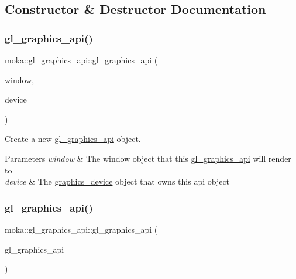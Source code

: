 \subsection{Constructor \& Destructor Documentation}
\mbox{\label{classmoka_1_1gl__graphics__api_a8e65801bf2edf0891bae8936f964ed0f}} 
\subsubsection{\texorpdfstring{gl\_graphics\_api()}{gl\_graphics\_api()}\hspace{0.1cm}{\footnotesize\ttfamily [1/3]}}
{\footnotesize\ttfamily moka\+::gl\+\_\+graphics\+\_\+api\+::gl\+\_\+graphics\+\_\+api (\begin{DoxyParamCaption}\item[{\mbox{\hyperlink{classmoka_1_1window}{window}} \&}]{window,  }\item[{\mbox{\hyperlink{classmoka_1_1graphics__device}{graphics\+\_\+device}} \&}]{device }\end{DoxyParamCaption})}



Create a new \mbox{\hyperlink{classmoka_1_1gl__graphics__api}{gl\+\_\+graphics\+\_\+api}} object. 


\begin{DoxyParams}{Parameters}
{\em window} & The window object that this \mbox{\hyperlink{classmoka_1_1gl__graphics__api}{gl\+\_\+graphics\+\_\+api}} will render to\\
\hline
{\em device} & The \mbox{\hyperlink{classmoka_1_1graphics__device}{graphics\+\_\+device}} object that owns this api object \\
\hline
\end{DoxyParams}
\mbox{\label{classmoka_1_1gl__graphics__api_a59aae29a0b801cccdba2c8017dd527b2}} 
\subsubsection{\texorpdfstring{gl\_graphics\_api()}{gl\_graphics\_api()}\hspace{0.1cm}{\footnotesize\ttfamily [2/3]}}
{\footnotesize\ttfamily moka\+::gl\+\_\+graphics\+\_\+api\+::gl\+\_\+graphics\+\_\+api (\begin{DoxyParamCaption}\item[{const \mbox{\hyperlink{classmoka_1_1gl__graphics__api}{gl\+\_\+graphics\+\_\+api}} \&}]{gl\+\_\+graphics\+\_\+api }\end{DoxyParamCaption})\hspace{0.3cm}{\ttfamily [delete]}}

